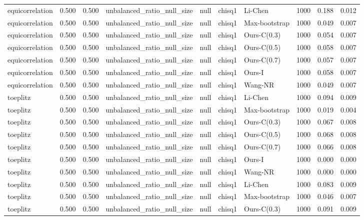 \begin{tabular}{lrrllllrrr}
equicorrelation & 0.500 & 0.500 & unbalanced\_ratio\_null\_size & null & chisq1 & Li-Chen & 1000 & 0.188 & 0.012 \\
equicorrelation & 0.500 & 0.500 & unbalanced\_ratio\_null\_size & null & chisq1 & Max-bootstrap & 1000 & 0.049 & 0.007 \\
equicorrelation & 0.500 & 0.500 & unbalanced\_ratio\_null\_size & null & chisq1 & Ours-C(0.3) & 1000 & 0.054 & 0.007 \\
equicorrelation & 0.500 & 0.500 & unbalanced\_ratio\_null\_size & null & chisq1 & Ours-C(0.5) & 1000 & 0.058 & 0.007 \\
equicorrelation & 0.500 & 0.500 & unbalanced\_ratio\_null\_size & null & chisq1 & Ours-C(0.7) & 1000 & 0.057 & 0.007 \\
equicorrelation & 0.500 & 0.500 & unbalanced\_ratio\_null\_size & null & chisq1 & Ours-I & 1000 & 0.058 & 0.007 \\
equicorrelation & 0.500 & 0.500 & unbalanced\_ratio\_null\_size & null & chisq1 & Wang-NR & 1000 & 0.049 & 0.007 \\
toeplitz & 0.500 & 0.500 & unbalanced\_ratio\_null\_size & null & chisq1 & Li-Chen & 1000 & 0.094 & 0.009 \\
toeplitz & 0.500 & 0.500 & unbalanced\_ratio\_null\_size & null & chisq1 & Max-bootstrap & 1000 & 0.019 & 0.004 \\
toeplitz & 0.500 & 0.500 & unbalanced\_ratio\_null\_size & null & chisq1 & Ours-C(0.3) & 1000 & 0.067 & 0.008 \\
toeplitz & 0.500 & 0.500 & unbalanced\_ratio\_null\_size & null & chisq1 & Ours-C(0.5) & 1000 & 0.068 & 0.008 \\
toeplitz & 0.500 & 0.500 & unbalanced\_ratio\_null\_size & null & chisq1 & Ours-C(0.7) & 1000 & 0.066 & 0.008 \\
toeplitz & 0.500 & 0.500 & unbalanced\_ratio\_null\_size & null & chisq1 & Ours-I & 1000 & 0.000 & 0.000 \\
toeplitz & 0.500 & 0.500 & unbalanced\_ratio\_null\_size & null & chisq1 & Wang-NR & 1000 & 0.000 & 0.000 \\
toeplitz & 0.500 & 0.500 & unbalanced\_ratio\_null\_size & null & chisq1 & Li-Chen & 1000 & 0.083 & 0.009 \\
toeplitz & 0.500 & 0.500 & unbalanced\_ratio\_null\_size & null & chisq1 & Max-bootstrap & 1000 & 0.046 & 0.007 \\
toeplitz & 0.500 & 0.500 & unbalanced\_ratio\_null\_size & null & chisq1 & Ours-C(0.3) & 1000 & 0.091 & 0.009 \\

\end{tabular}
